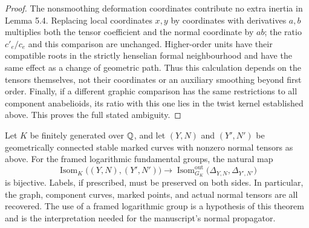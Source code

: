 \begin{proof}
The nonsmoothing deformation coordinates contribute no extra inertia in Lemma 5.4. Replacing local coordinates $x,y$ by coordinates with derivatives $a,b$ multiplies both the tensor coefficient and the normal coordinate by $ab$; the ratio $c'_e/c_e$ and this comparison are unchanged. Higher-order units have their compatible roots in the strictly henselian formal neighbourhood and have the same effect as a change of geometric path. Thus this calculation depends on the tensors themselves, not their coordinates or an auxiliary smoothing beyond first order. Finally, if a different graphic comparison has the same restrictions to all component anabelioids, its ratio with this one lies in the twist kernel established above. This proves the full stated ambiguity.
\end{proof}

\begin{theorem}\label{A6-anabelian}
Let $K$ be finitely generated over ${\mathbb{Q}}$, and let $(Y,N)$ and $(Y',N')$ be geometrically connected stable marked curves with nonzero normal tensors as above. For the framed logarithmic fundamental groups, the natural map
\[
 \operatorname{Isom}_K\bigl((Y,N),(Y',N')\bigr)
 \longrightarrow
 \operatorname{Isom}^{\mathrm{out}}_{G_K}
       \bigl(\Delta_{Y,N},\Delta_{Y',N'}\bigr)
\]
is bijective. Labels, if prescribed, must be preserved on both sides. In particular, the graph, component curves, marked points, and actual normal tensors are all recovered. The use of a framed logarithmic group is a hypothesis of this theorem and is the interpretation needed for the manuscript's normal propagator.
\end{theorem}
